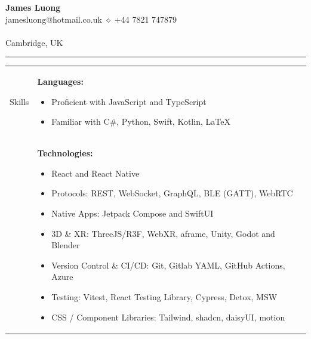 \documentclass[11pt]{article}
\begin{document}
\begin{minipage}[t][0pt]{\linewidth} %
	\begin{center}
		{\LARGE\textbf{James Luong}} \\
		jamesluong@hotmail.co.uk $\diamond$ +44 7821 747879 \\

		\href{https://jluong23.github.io/blog}{\color{Blue}{jluong23.github.io/blog}} \\

		Cambridge, UK \\
		\hrule
	\end{center}


	\begin{tabular}[t]{p{2cm} p{14cm}}
	               {Skills} &
	               \textbf{Languages:}
	               \begin{itemize}
		               \renewcommand{\labelitemi}{$\diamond$}
		               \item Proficient with JavaScript and TypeScript
		               \item Familiar with C\#, Python, Swift, Kotlin, \LaTeX
	               \end{itemize}                                                                                                                                                              \\ &

	               \textbf{Technologies:}
	               \begin{itemize}
		               \renewcommand{\labelitemi}{$\diamond$}
		               \item React and React Native
		               \item Protocols: REST, WebSocket, GraphQL, BLE (GATT), WebRTC
		               \item Native Apps: Jetpack Compose and SwiftUI
		               \item 3D \& XR: ThreeJS/R3F, WebXR, aframe, Unity, Godot and Blender
		               \item Version Control \& CI/CD: Git, Gitlab YAML, GitHub Actions, Azure
		               \item Testing: Vitest, React Testing Library, Cypress, Detox, MSW
		               \item CSS / Component Libraries: Tailwind, shadcn, daisyUI, motion
	               \end{itemize}                                                                                                                                             \\


\end{tabular}
\end{minipage}
\end{document}
